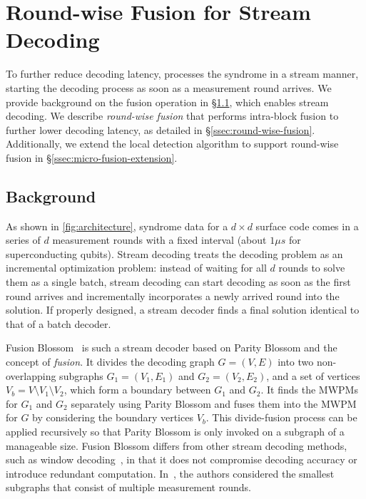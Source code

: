 \section{Round-wise Fusion for Stream Decoding}\label{sec:fusion}

To further reduce decoding latency, \arch processes the syndrome in a stream manner, starting the decoding process as soon as a measurement round arrives.
We provide background on the fusion operation in \S\ref{ssec:background-fusion}, which enables stream decoding.
We describe \emph{round-wise fusion} that performs intra-block fusion to further lower decoding latency, as detailed in \S\ref{ssec:round-wise-fusion}.
Additionally, we extend the local \conf detection algorithm to support round-wise fusion in \S\ref{ssec:micro-fusion-extension}.

\subsection{Background}\label{ssec:background-fusion}

As shown in \autoref{fig:architecture}, syndrome data for a $d\times d$ surface code comes in a series of $d$ measurement rounds with a fixed interval (about $1\mu s$ for superconducting qubits).
Stream decoding treats the decoding problem as an incremental optimization problem: instead of waiting for all $d$ rounds to solve them as a single batch, stream decoding can start decoding as soon as the first round arrives and incrementally incorporates a newly arrived round into the solution.
If properly designed, a stream decoder finds a final solution identical to that of a batch decoder.

Fusion Blossom~\cite{wu2023qce} is such a stream decoder based on Parity Blossom and the concept of \emph{fusion}.
It divides the decoding graph $G= (V, E)$ into two non-overlapping subgraphs $G_1=(V_1, E_1)$ and $G_2=(V_2, E_2)$,  and a set of vertices $V_b = V \setminus V_1 \setminus V_2$, which form a boundary between $G_1$ and $G_2$.
It finds the MWPMs for $G_1$ and $G_2$ separately using Parity Blossom and fuses them into the MWPM for $G$ by considering the boundary vertices $V_b$.
This divide-fusion process can be applied recursively so that Parity Blossom is only invoked on a subgraph of a manageable size.
Fusion Blossom differs from other stream decoding methods, such as window decoding~\cite{dennis2002topological,iyengar2011windowed,skoric2023parallel,tan2022scalable,bombin2023modular}, in that it does not compromise decoding accuracy or introduce redundant computation.
In~\cite{wu2023qce}, the authors considered the smallest subgraphs that consist of multiple measurement rounds.

